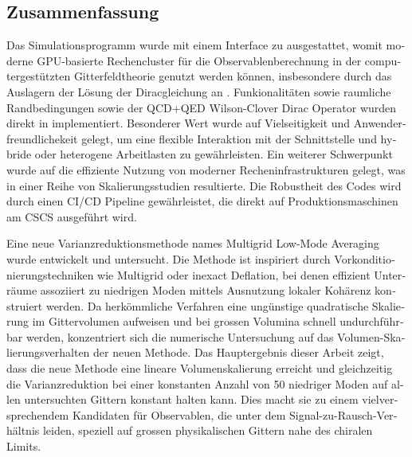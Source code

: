 \begin{otherlanguage}{ngerman}
\chapter*{Zusammenfassung}

Das Simulationsprogramm \openqxd wurde mit einem Interface zu \quda ausgestattet, womit moderne GPU-basierte Rechencluster für die Observablenberechnung in der computergestützten Gitterfeldtheorie genutzt werden können, insbesondere durch das Auslagern der Lösung der Diracgleichung an \quda.
Funkionalitäten sowie raumliche \Cstar Randbedingungen sowie der QCD+QED Wilson-Clover Dirac Operator wurden direkt in \quda implementiert.
Besonderer Wert wurde auf Vielseitigkeit und Anwenderfreundlichekeit gelegt, um eine flexible Interaktion mit der Schnittstelle und hybride oder heterogene Arbeitlasten zu gewährleisten.
Ein weiterer Schwerpunkt wurde auf die effiziente Nutzung von moderner Recheninfrastrukturen gelegt, was in einer Reihe von Skalierungsstudien resultierte.
Die Robustheit des Codes wird durch einen CI/CD Pipeline gewährleistet, die direkt auf Produktionsmaschinen am CSCS ausgeführt wird.

Eine neue Varianzreduktionsmethode names Multigrid Low-Mode Averaging wurde entwickelt und untersucht.
Die Methode ist inspiriert durch Vorkonditionierungstechniken wie Multigrid oder inexact Deflation, bei denen effizient Unterräume assoziiert zu niedrigen Moden mittels Ausnutzung lokaler Kohärenz konstruiert werden.
Da herkömmliche Verfahren eine ungünstige quadratische Skalierung im Gittervolumen aufweisen und bei grossen Volumina schnell undurchführbar werden, konzentriert sich die numerische Untersuchung auf das Volumen-Skalierungsverhalten der neuen Methode.
Das Hauptergebnis dieser Arbeit zeigt, dass die neue Methode eine lineare Volumenskalierung erreicht und gleichzeitig die Varianzreduktion bei einer konstanten Anzahl von \num{50} niedriger Moden auf allen untersuchten Gittern konstant halten kann.
Dies macht sie zu einem vielversprechendem Kandidaten für Observablen, die unter dem Signal-zu-Rausch-Verhältnis leiden, speziell auf grossen physikalischen Gittern nahe des chiralen Limits.

\end{otherlanguage}

\endgroup

\vfill